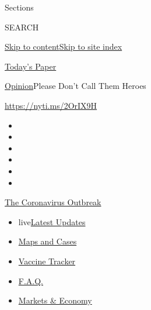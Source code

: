 Sections

SEARCH

\protect\hyperlink{site-content}{Skip to
content}\protect\hyperlink{site-index}{Skip to site index}

\href{https://myaccount.nytimes.com/auth/login?response_type=cookie\&client_id=vi}{}

\href{https://www.nytimes.com/section/todayspaper}{Today's Paper}

\href{/section/opinion}{Opinion}\textbar{}Please Don't Call Them Heroes

\href{https://nyti.ms/2OrIX9H}{https://nyti.ms/2OrIX9H}

\begin{itemize}
\item
\item
\item
\item
\item
\item
\end{itemize}

\href{https://www.nytimes.com/news-event/coronavirus?action=click\&pgtype=Article\&state=default\&region=TOP_BANNER\&context=storylines_menu}{The
Coronavirus Outbreak}

\begin{itemize}
\tightlist
\item
  live\href{https://www.nytimes.com/2020/08/08/world/coronavirus-updates.html?action=click\&pgtype=Article\&state=default\&region=TOP_BANNER\&context=storylines_menu}{Latest
  Updates}
\item
  \href{https://www.nytimes.com/interactive/2020/us/coronavirus-us-cases.html?action=click\&pgtype=Article\&state=default\&region=TOP_BANNER\&context=storylines_menu}{Maps
  and Cases}
\item
  \href{https://www.nytimes.com/interactive/2020/science/coronavirus-vaccine-tracker.html?action=click\&pgtype=Article\&state=default\&region=TOP_BANNER\&context=storylines_menu}{Vaccine
  Tracker}
\item
  \href{https://www.nytimes.com/interactive/2020/world/coronavirus-tips-advice.html?action=click\&pgtype=Article\&state=default\&region=TOP_BANNER\&context=storylines_menu}{F.A.Q.}
\item
  \href{https://www.nytimes.com/live/2020/08/07/business/stock-market-today-coronavirus?action=click\&pgtype=Article\&state=default\&region=TOP_BANNER\&context=storylines_menu}{Markets
  \& Economy}
\end{itemize}

